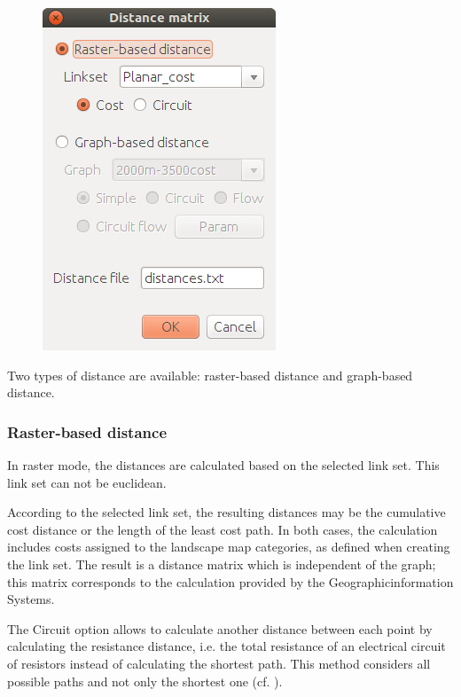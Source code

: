 \documentclass{article}
\begin{document}
\begin{figure}[H]
	\includegraphics[scale=0.5]{img/manual-en_point_matrix.png} 
\end{figure}

Two types of distance are available: raster-based distance and graph-based distance.

\subsubsection{Raster-based distance}

In raster mode, the distances are calculated based on the selected link set. This link set can not be euclidean.

According to the selected link set, the resulting distances may be the cumulative cost  distance or the length of the least cost path. In both cases, the calculation includes  costs assigned to the landscape map categories, as defined when creating the link set. The result is a distance matrix which is independent of the graph; this matrix corresponds to the calculation provided by the Geographicinformation Systems. 

The Circuit option allows to calculate another distance between each point by calculating the resistance distance, i.e. the total resistance of an electrical circuit of resistors instead of calculating the shortest path. This method considers all possible paths and not only the shortest one (cf. \cite{McRae2008}).
\end{document}
